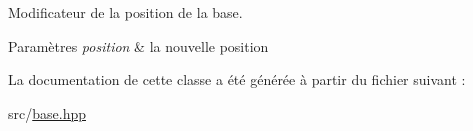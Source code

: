 Modificateur de la position de la base. 


\begin{DoxyParams}{Paramètres}
{\em position} & la nouvelle position \\
\hline
\end{DoxyParams}


La documentation de cette classe a été générée à partir du fichier suivant \+:\begin{DoxyCompactItemize}
\item 
src/\hyperlink{base_8hpp}{base.\+hpp}\end{DoxyCompactItemize}
